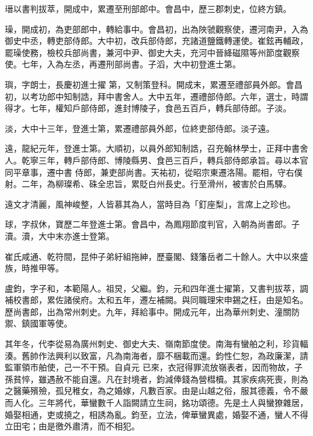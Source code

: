 \begin{pinyinscope}
 瑨以書判拔萃，開成中，累遷至刑部郎中。會昌中，歷三郡刺史，位終方鎮。



 璪，開成初，為吏部郎中，轉給事中。會昌初，出為陜虢觀察使，遷河南尹，入為御史中丞，轉吏部侍郎。大中初，改兵部侍郎，充諸道鹽鐵轉運使。崔鉉再輔政，罷璪使務，檢校兵部尚書，兼河中尹、御史大夫，充河中晉絳磁隰等州節度觀察使。七年，入為左丞，再遷刑部尚書。子滔，大中初登進士第。



 璵，字朗士，長慶初進士擢
 第，又制策登科。開成末，累遷至禮部員外郎。會昌初，以考功郎中知制誥，拜中書舍人。大中五年，遷禮部侍郎。六年，選士，時謂得才。七年，權知戶部侍郎，進封博陵子，食邑五百戶，轉兵部侍郎。子淡。



 淡，大中十三年，登進士第，累遷禮部員外郎，位終吏部侍郎。淡子遠。



 遠，龍紀元年，登進士第。大順初，以員外郎知制誥，召充翰林學士，正拜中書舍人。乾寧三年，轉戶部侍郎、博陵縣男、食邑三百戶，轉兵部侍郎承旨。尋以本官同平章事，遷中書
 侍郎，兼吏部尚書。天祐初，從昭宗東遷洛陽。罷相，守右僕射。二年，為柳璨希、硃全忠旨，累貶白州長史。行至滑州，被害於白馬驛。



 遠文才清麗，風神峻整，人皆慕其為人，當時目為「釘座梨」，言席上之珍也。



 球，字叔休，寶歷二年登進士第。會昌中，為鳳翔節度判官，入朝為尚書郎。子瀆。瀆，大中末亦進士登第。



 崔氏咸通、乾符間，昆仲子弟紆組拖紳，歷臺閣、錢籓岳者二十餘人。大中以來盛族，時推甲等。



 盧鈞，字子和，本範陽人。祖炅，父繼。鈞，元和四年進士擢第，又書判拔萃，調補校書郎，累佐諸侯府。太和五年，遷左補闕。與同職理宋申錫之枉，由是知名。歷尚書郎，出為常州刺史。九年，拜給事中。開成元年，出為華州刺史、潼關防禦、鎮國軍等使。



 其年冬，代李從易為廣州刺史、御史大夫、嶺南節度使。南海有蠻舶之利，珍貨輻湊。舊帥作法興利以致富，凡為南海者，靡不梱載而還。鈞性仁恕，為政廉潔，請監軍領市舶使，己一不干預。自貞元
 已來，衣冠得罪流放嶺表者，因而物故，子孫貧悴，雖遇赦不能自還。凡在封境者，鈞減俸錢為營槥櫝。其家疾病死喪，則為之醫藥殯殮，孤兒稚女，為之婚嫁，凡數百家。由是山越之俗，服其德義，令不嚴而人化。三年將代，華蠻數千人詣闕請立生祠，銘功頌德。先是土人與蠻獠雜居，婚娶相通，吏或撓之，相誘為亂。鈞至，立法，俾華蠻異處，婚娶不通，蠻人不得立田宅；由是徼外肅清，而不相犯。




\end{pinyinscope}
